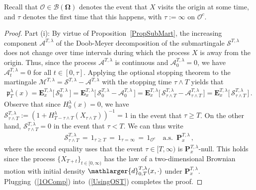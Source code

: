 \documentclass[10pt]{article}
\numberwithin{equation}{section}
\theoremstyle{definition}
\begin{document}
Recall that   $\mathcal{O}\in \mathscr{B}(\boldsymbol{\Omega})$ denotes the event that  $X$ visits the origin at some time, and  $\tau$ denotes the first time that this happens, with $\tau:=\infty$ on $\mathcal{O}^c$.





\begin{proof} Part (i):  By virtue of Proposition~\ref{PropSubMart}, the increasing component $\mathcal{A}^{T,\lambda}$ of the Doob-Meyer decomposition of the submartingale $\mathcal{S}^{T,\lambda}$ does not change over time intervals during which the process $X$ is away from the origin. Thus, since the process $\mathcal{A}^{T,\lambda}$ is continuous and  $\mathcal{A}^{T,\lambda}_0=0$, we have $\mathcal{A}_{t}^{T,\lambda}=0$ for all $t\in [0,\tau]$.   Applying the optional stopping theorem to the  martingale $\mathcal{M}^{T,\lambda}=\mathcal{S}^{T,\lambda} -\mathcal{A}^{T,\lambda} $ with the stopping time $\tau \wedge T$  yields that
\begin{align}\label{UsingOST}
\mathfrak{p}_{T}^{\lambda}( x) =  \mathbf{E}_{x  }^{T,\lambda}\Big[\, \mathcal{S}_{0}^{T,\lambda}\, \Big]=  \mathbf{E}_{x  }^{T,\lambda}\Big[\, \mathcal{S}_{0}^{T,\lambda} -\mathcal{A}_{0}^{T,\lambda} \,\Big]=  \mathbf{E}_{x  }^{T,\lambda}\Big[\, \mathcal{S}_{\tau \wedge T}^{T,\lambda} -\mathcal{A}_{\tau \wedge T}^{T,\lambda} \,\Big] =\mathbf{E}_{x }^{T,\lambda }\Big[ \,\mathcal{S}_{\tau \wedge T}^{T,\lambda} \,\Big]\,.  
\end{align}
Observe that since $H_{0}^{\lambda}(x)=0$, we have $ \mathcal{S}_{\tau \wedge T}^{T,\lambda}:=(  1+H_{T-\tau \wedge T}^{\lambda}( X_{\tau \wedge T})  )^{-1}=1$ in the event that $\tau\geq T$.  On the other hand, $ \mathcal{S}_{\tau \wedge T}^{T,\lambda}=0$ in the event that $\tau < T$.  We can thus write
\begin{align}\label{1OComp}
\mathcal{S}_{\tau \wedge T}^{T,\lambda}\,=\, 1_{\tau\geq T}\,=\, 1_{\tau=\infty}  \,=\,1_{\mathcal{O}^c}\quad \text{a.s. }\,\mathbf{P}_{x }^{T,\lambda }\,, 
\end{align}
where the   second equality uses that the event $\tau\in [T,\infty)$ is $\mathbf{P}_{x }^{T,\lambda }$-null. This holds since the process $\{X_{T+t}  \}_{t\in [0,\infty)}$ has the law of a two-dimensional Brownian motion with initial density $  \mathlarger{d}_{0,T}^{T,\lambda}(x,\cdot)$ under $\mathbf{P}_{x }^{T,\lambda }$.  Plugging~(\ref{1OComp}) into~(\ref{UsingOST}) completes the proof.\vspace{.3cm}


\end{proof}
\end{document}
